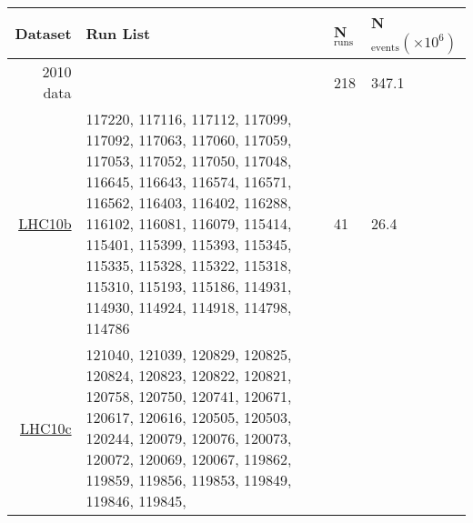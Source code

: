 \begin{table}[h]
\center
\begin{tabularx}{\textwidth}{r|Xll}
Dataset		&Run List 			&N$_{\text{runs}}$		&N$_{\text{events}} (\times10^{6})$\\
\hline
\hline
2010	 data		&				&218				&347.1								\\
\hline
\href{https://alimonitor.cern.ch/configuration/index.jsp?partition=LHC10b\&pass=4\&s=\&raw_run=\&filling_scheme=\&filling_config=\&fillno=\&energy=\&intensity_per_bunch=\&mu=\&interacting_bunches=\&noninteracting_bunches_beam_1=\&noninteracting_bunches_beam_2=\&interaction_trigger=\&rate=\&beam_empty_trigger=\&empty_empty_trigger=\&muon_trigger=\&high_multiplicity_trigger=\&emcal_trigger=\&calibration_trigger=\&quality=1\&muon_quality=\&physics_selection_status=\&comment=\&field=\&det_aco=\&det_ad0=\&det_emc=\&det_fmd=\&det_hlt=\&det_hmp=\&det_mch=\&det_mtr=\&det_phs=\&det_pmd=\&det_spd=\&det_sdd=\&det_ssd=\&det_tof=X\&det_tpc=X\&det_trd=\&det_t00=X\&det_v00=X\&det_zdc=\&hlt_mode=\&changedon=}{LHC10b}		&117220, 117116, 117112, 117099, 117092, 117063, 117060, 117059, 117053, 117052,
                                117050, 117048, 116645, 116643, 116574, 116571, 116562, 116403, 116402, 116288,
                                116102, 116081, 116079, 115414, 115401, 115399, 115393, 115345, 115335, 115328,
                                115322, 115318, 115310, 115193, 115186, 114931, 114930, 114924, 114918, 114798,
                                114786				&41				&26.4								\\
\href{https://alimonitor.cern.ch/configuration/index.jsp?partition=LHC10c\&pass=4\&s=\&raw_run=\&filling_scheme=\&filling_config=\&fillno=\&energy=\&intensity_per_bunch=\&mu=\&interacting_bunches=\&noninteracting_bunches_beam_1=\&noninteracting_bunches_beam_2=\&interaction_trigger=\&rate=\&beam_empty_trigger=\&empty_empty_trigger=\&muon_trigger=\&high_multiplicity_trigger=\&emcal_trigger=\&calibration_trigger=\&quality=1\&muon_quality=\&physics_selection_status=\&comment=\&field=\&det_aco=\&det_ad0=\&det_emc=\&det_fmd=\&det_hlt=\&det_hmp=\&det_mch=\&det_mtr=\&det_phs=\&det_pmd=\&det_spd=\&det_sdd=\&det_ssd=\&det_tof=X\&det_tpc=X\&det_trd=\&det_t00=X\&det_v00=X\&det_zdc=\&hlt_mode=\&changedon=}{LHC10c}		&121040, 121039, 120829, 120825, 120824, 120823, 120822, 120821, 120758, 120750,
                                120741, 120671, 120617, 120616, 120505, 120503, 120244, 120079, 120076, 120073,
                                120072, 120069, 120067, 119862, 119859, 119856, 119853, 119849, 119846, 119845,

\end{tabularx}
\end{table}
